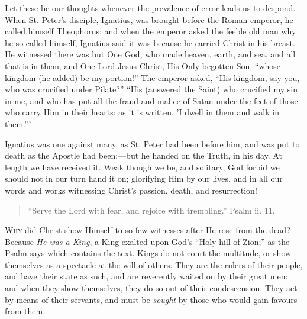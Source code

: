 Let these be our thoughts whenever the prevalence of
error leads us to despond. When St. Peter's disciple,
Ignatius, was brought before the Roman emperor, he called
himself Theophorus; and when the emperor asked the feeble
old man why he so called himself, Ignatius said it was
because he carried Christ in his breast. He witnessed
there was but One God, who made heaven, earth, and sea,
and all that is in them, and One Lord Jesus Christ, His
Only-begotten Son, ``whose kingdom (he added) be my
portion!'' The emperor asked, ``His kingdom, say
you, who was crucified under Pilate?'' ``His
(answered the Saint) who crucified my sin in me, and who
has put all the fraud and malice of Satan under the feet
of those who carry Him in their hearts: as it is written,
'I dwell in them and walk in them.'''

Ignatius was one against many, as St. Peter had been
before him; and was put to death as the Apostle had
been;—but he handed on the Truth, in his day. At
length we have received it. Weak though we be, and
solitary, God forbid we should not in our turn hand it
on; glorifying Him by our lives, and in all our words and
works witnessing Christ's passion, death, and
resurrection!


\begin{quote}

``Serve the Lord with fear, and rejoice with
trembling.'' Psalm ii. 11.

\end{quote}

W\textsc{hy} did Christ show Himself to so few witnesses after
He rose from the dead? Because \emph{He was a King}, a
King exalted upon God's ``Holy hill of Zion;'' as
the Psalm says which contains the text. Kings do not
court the multitude, or show themselves as a spectacle at
the will of others. They are the rulers of their people,
and have their state as such, and are reverently waited
on by their great men: and when they show themselves,
they do so out of their condescension. They act by means
of their servants, and must be \emph{sought} by those who
would gain favours from them.

